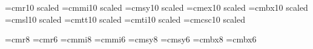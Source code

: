  
\ifx\tenpoint\undefined\let\loadedfrommacro=Y
         
         \let\loadedfrommacro=N\fi
 
\font\elevenrm=cmr10    scaled \magstephalf
\font\eleveni=cmmi10    scaled \magstephalf
\font\elevensy=cmsy10   scaled \magstephalf
\font\elevenex=cmex10   scaled \magstephalf
\font\elevenbf=cmbx10   scaled \magstephalf
\font\elevensl=cmsl10   scaled \magstephalf
\font\eleventt=cmtt10   scaled \magstephalf
\font\elevenit=cmti10   scaled \magstephalf
\font\elevencsc=cmcsc10 scaled \magstephalf
 
\font\eightrm=cmr8           \font\sixrm=cmr6
\font\eighti=cmmi8           \font\sixi=cmmi6
\font\eightsy=cmsy8          \font\sixsy=cmsy6
\font\eightbf=cmbx8          \font\sixbf=cmbx6
 
\ifx\elevenpoint\undefined
   \def\elevenpoint{\def\rm{\fam0\elevenrm}%
       \textfont0=\elevenrm \scriptfont0=\eightrm \scriptscriptfont0=\sixrm
       \textfont1=\eleveni  \scriptfont1=\eighti  \scriptscriptfont1=\sixi
       \textfont2=\elevensy \scriptfont2=\eightsy \scriptscriptfont2=\sixsy
       \textfont3=\elevenex \scriptfont3=\elevenex\scriptscriptfont3=\elevenex
       \textfont\itfam=\elevenit  \def\it{\fam\itfam\elevenit}%
       \textfont\slfam=\elevensl  \def\sl{\fam\slfam\elevensl}%
       \textfont\ttfam=\eleventt  \def\tt{\fam\ttfam\eleventt}%
       \textfont\bffam=\elevenbf  \scriptfont\bffam=\eightbf
        \scriptscriptfont\bffam=\sixbf  \def\bf{\fam\bffam\elevenbf}%
       \textfont\scfam=\elevencsc \def\sc{\fam\scfam\elevencsc}%
       \normalbaselineskip=14pt
       \setbox\strutbox=\hbox{\vrule height9pt depth4pt width0pt}%
       \normalbaselines\rm}
   \fi
